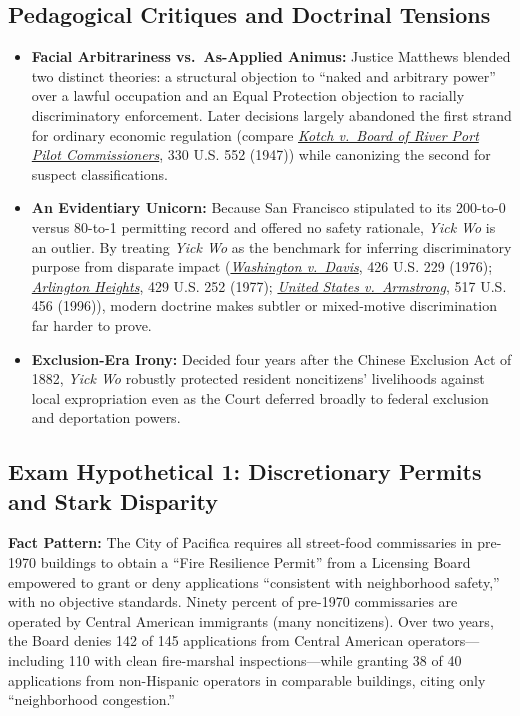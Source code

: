 \documentclass[12pt]{article}
\begin{document}
\subsection{Pedagogical Critiques and Doctrinal Tensions}
\begin{itemize}
    \item \textbf{Facial Arbitrariness vs.\ As-Applied Animus:} Justice Matthews blended two distinct theories: a structural objection to ``naked and arbitrary power'' over a lawful occupation and an Equal Protection objection to racially discriminatory enforcement. Later decisions largely abandoned the first strand for ordinary economic regulation (compare \href{https://supreme.justia.com/cases/federal/us/330/552/}{\emph{Kotch v.\ Board of River Port Pilot Commissioners}}, 330 U.S. 552 (1947)) while canonizing the second for suspect classifications.
    \item \textbf{An Evidentiary Unicorn:} Because San Francisco stipulated to its 200-to-0 versus 80-to-1 permitting record and offered no safety rationale, \emph{Yick Wo} is an outlier. By treating \emph{Yick Wo} as the benchmark for inferring discriminatory purpose from disparate impact (\href{https://supreme.justia.com/cases/federal/us/426/229/}{\emph{Washington v.\ Davis}}, 426 U.S. 229 (1976); \href{https://supreme.justia.com/cases/federal/us/429/252/}{\emph{Arlington Heights}}, 429 U.S. 252 (1977); \href{https://supreme.justia.com/cases/federal/us/517/456/}{\emph{United States v.\ Armstrong}}, 517 U.S. 456 (1996)), modern doctrine makes subtler or mixed-motive discrimination far harder to prove.
    \item \textbf{Exclusion-Era Irony:} Decided four years after the Chinese Exclusion Act of 1882, \emph{Yick Wo} robustly protected resident noncitizens' livelihoods against local expropriation even as the Court deferred broadly to federal exclusion and deportation powers.
\end{itemize}

\subsection{Exam Hypothetical 1: Discretionary Permits and Stark Disparity}
\textbf{Fact Pattern:} The City of Pacifica requires all street-food commissaries in pre-1970 buildings to obtain a ``Fire Resilience Permit'' from a Licensing Board empowered to grant or deny applications ``consistent with neighborhood safety,'' with no objective standards. Ninety percent of pre-1970 commissaries are operated by Central American immigrants (many noncitizens). Over two years, the Board denies 142 of 145 applications from Central American operators---including 110 with clean fire-marshal inspections---while granting 38 of 40 applications from non-Hispanic operators in comparable buildings, citing only ``neighborhood congestion.''
\end{document}
